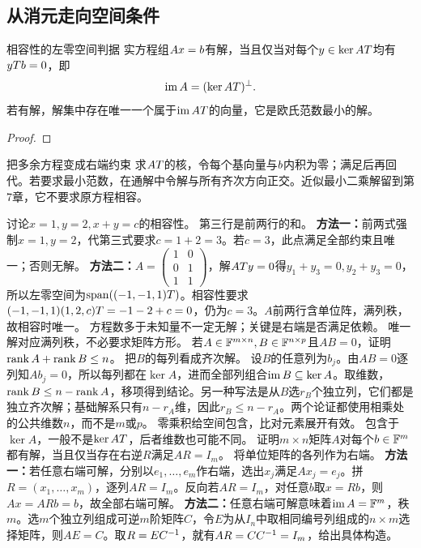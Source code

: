 \subsection{从消元走向空间条件}
\begin{theorem}{相容性的左零空间判据}
实方程组$Ax=b$有解，当且仅当对每个$y\in\ker AT$均有$yTb=0$，即
\begin{equation}\operatorname{im} A=(\ker AT)^\perp.\label{eq:compat}\end{equation}
若有解，解集中存在唯一一个属于$\operatorname{im} AT$的向量，它是欧氏范数最小的解。
\end{theorem}
\begin{proof}

\end{proof}
\begin{method}{把多余方程变成右端约束}
求$AT$的核，令每个基向量与$b$内积为零；满足后再回代。若要求最小范数，在通解中令解与所有齐次方向正交。近似最小二乘解留到第7章，它不要求原方程相容。
\end{method}
{讨论$x=1,y=2,x+y=c$的相容性。}
{第三行是前两行的和。}
{\textbf{方法一：}前两式强制$x=1,y=2$，代第三式要求$c=1+2=3$。若$c=3$，此点满足全部约束且唯一；否则无解。
\textbf{方法二：}$A=\begin{pmatrix}1&0\\0&1\\1&1\end{pmatrix}$，解$AT y=0$得$y_1+y_3=0,y_2+y_3=0$，所以左零空间为$\operatorname{span}((-1,-1,1)T)$。相容性要求$(-1,-1,1)(1,2,c)T=-1-2+c=0$，仍为$c=3$。$A$前两行含单位阵，满列秩，故相容时唯一。}
{方程数多于未知量不一定无解；关键是右端是否满足依赖。}
{唯一解对应满列秩，不必要求矩阵方形。}
{若$A\in\mathbb{F}^{m\times n},B\in\mathbb{F}^{n\times p}$且$AB=0$，证明$\operatorname{rank} A+\operatorname{rank} B\le n$。}
{把$B$的每列看成齐次解。}
{设$B$的任意列为$b_j$。由$AB=0$逐列知$Ab_j=0$，所以每列都在$\ker A$，进而全部列组合$\operatorname{im} B\subseteq\ker A$。取维数，$\operatorname{rank} B\le n-\operatorname{rank} A$，移项得到结论。另一种写法是从$B$选$r_B$个独立列，它们都是独立齐次解；基础解系只有$n-r_A$维，因此$r_B\le n-r_A$。两个论证都使用相乘处的公共维数$n$，而不是$m$或$p$。}
{零乘积给空间包含，比对元素展开有效。}
{包含于$\ker A$，一般不是$\ker AT$，后者维数也可能不同。}
{证明$m\times n$矩阵$A$对每个$b\in\mathbb{F}^m$都有解，当且仅当存在右逆$R$满足$AR=I_m$。}
{将单位矩阵的各列作为右端。}
{\textbf{方法一：}若任意右端可解，分别以$e_1,\ldots,e_m$作右端，选出$x_j$满足$Ax_j=e_j$。拼$R=(x_1,\ldots,x_m)$，逐列$AR=I_m$。反向若$AR=I_m$，对任意$b$取$x=Rb$，则$Ax=ARb=b$，故全部右端可解。
\textbf{方法二：}任意右端可解意味着$\operatorname{im} A=\mathbb{F}^m$，秩$m$。选$m$个独立列组成可逆$m$阶矩阵$C$，令$E$为从$I_n$中取相同编号列组成的$n\times m$选择矩阵，则$AE=C$。取$R=EC^{-1}$，就有$AR=CC^{-1}=I_m$，给出具体构造。}
